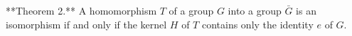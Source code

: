 **Theorem 2.** A homomorphism $T$ of a group $G$ into a group $\bar{G}$ is an isomorphism if and only if the kernel $H$ of $T$ contains only the identity $e$ of $G$.
